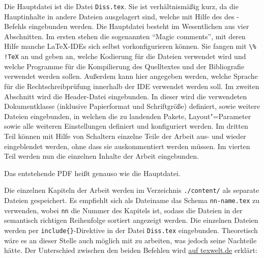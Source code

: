Die Hauptdatei ist die Datei \texttt{Diss.tex}.
Sie ist verhältnismäßig kurz, da die Hauptinhalte in andere Dateien ausgelagert sind, welche mit Hilfe des \verb++ \bzw des \verb++-Befehls eingebunden werden.
Die Hauptdatei besteht im Wesentlichen aus vier Abschnitten.
Im ersten stehen die sogenannten \enquote{Magic comments}, mit deren Hilfe manche \LaTeX-IDEs sich selbst vorkonfigurieren können.
Sie fangen mit \verb+\% !TeX+ an und geben an, welche Kodierung für die Dateien verwendet wird und welche Programme für die Kompilierung des Quelltextes und der Bibliografie verwendet werden sollen.
Außerdem kann hier angegeben werden, welche Sprache für die Rechtschreibprüfung innerhalb der IDE verwendet werden soll.
Im zweiten Abschnitt wird die Header-Datei eingebunden.
In dieser wird die verwendeten Dokumentklasse (inklusive Papierformat und Schriftgröße) definiert, sowie weitere Dateien eingebunden,
in welchen die zu landenden Pakete, Layout"=Parameter sowie alle weiteren Einstellungen definiert und konfiguriert werden.
Im dritten Teil können mit Hilfe von Schaltern einzelne Teile der Arbeit aus- und wieder eingeblendet werden, ohne dass sie auskommentiert werden müssen.
Im vierten Teil werden nun die einzelnen Inhalte der Arbeit eingebunden.

Das entstehende PDF heißt genauso wie die Hauptdatei.

Die einzelnen Kapiteln der Arbeit werden im Verzeichnis \texttt{./content/} als separate Dateien gespeichert.
Es empfiehlt sich als Dateiname das Schema \texttt{nn-name.tex} zu verwenden, wobei \texttt{nn} die Nummer des Kapitels ist,
sodass die Dateien in der semantisch richtigen Reihenfolge sortiert angezeigt werden.
Die einzelnen Dateien werden per \verb+include{}+-Direktive in der Datei \texttt{Diss.tex} eingebunden.
Theoretisch wäre es an dieser Stelle auch möglich mit \verb++ zu arbeiten, was jedoch seine Nachteile hätte.
Der Unterschied zwischen den beiden Befehlen wird \href{https://texwelt.de/wissen/fragen/32/was-ist-der-unterschied-zwischen-include-and-input}{auf texwelt.de} erklärt:

